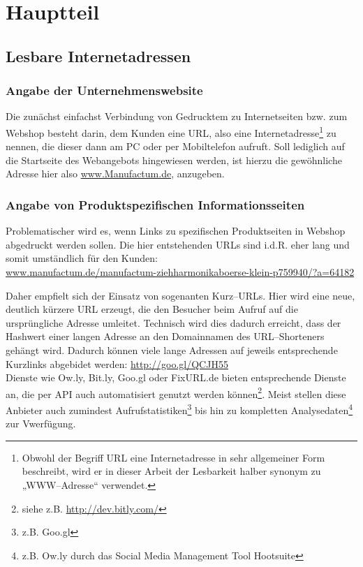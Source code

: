 \section{Hauptteil}
\label{sec:hauptteil}

\subsection{Lesbare Internetadressen}

\subsubsection{Angabe der Unternehmenswebsite}

Die zunächst einfachst Verbindung von Gedrucktem zu Internetseiten bzw. zum Webshop besteht darin, dem Kunden eine \ac{URL}, also eine Internetadresse\footnote{Obwohl der Begriff URL eine Internetadresse in sehr allgemeiner Form beschreibt, wird er in dieser Arbeit der Lesbarkeit halber synonym zu „WWW--Adresse“ verwendet.} zu nennen, die dieser dann am PC oder per Mobiltelefon aufruft.
Soll lediglich auf die Startseite des Webangebots hingewiesen werden, ist hierzu die gewöhnliche Adresse hier also \url{www.Manufactum.de}, anzugeben. 

\subsubsection{Angabe von Produktspezifischen Informationsseiten}

Problematischer wird es, wenn Links zu spezifischen Produktseiten in Webshop abgedruckt werden sollen. Die hier entstehenden \ac{URL}s sind i.d.R. eher lang und somit umständlich für den Kunden:\\ \url{www.manufactum.de/manufactum-ziehharmonikaboerse-klein-p759940/?a=64182}

Daher empfielt sich der Einsatz von sogenanten Kurz--URLs. Hier wird eine neue, deutlich kürzere \ac{URL} erzeugt, die den Besucher beim Aufruf auf die ursprüngliche Adresse umleitet. Technisch wird dies dadurch erreicht, dass der Hashwert einer langen Adresse an den Domainnamen des URL--Shorteners gehängt wird. Dadurch können viele lange Adressen auf jeweils
entsprechende Kurzlinks abgebidet werden: \url{http://goo.gl/QCJH55}\\
Dienste wie Ow.ly, Bit.ly, Goo.gl oder FixURL.de bieten entsprechende Dienste an, die per \ac{API} auch automatisiert genutzt werden können\footnote{siehe z.B. \url{http://dev.bitly.com/}}. Meist stellen diese Anbieter auch zumindest Aufrufstatistiken\footnote{z.B. Goo.gl} bis hin zu kompletten Analysedaten\footnote{z.B. Ow.ly durch das Social Media Management Tool Hootsuite} zur Vwerfügung.

